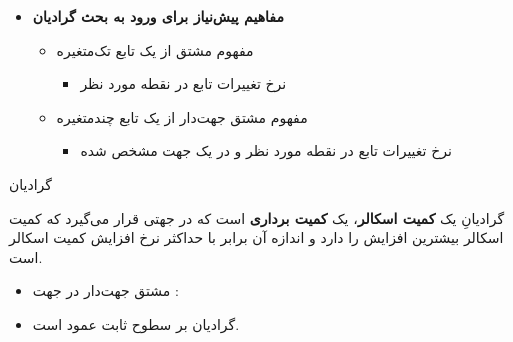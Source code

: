 \begin{ELunit}

\begin{itemize}
\tightlist
\item
  \textbf{مفاهیم پیش‌نیاز برای ورود به بحث گرادیان}

  \begin{itemize}
  \tightlist
  \item
    مفهوم مشتق از یک تابع تک‌متغیره

    \begin{itemize}
    \tightlist
    \item
      نرخ تغییرات تابع در نقطه مورد نظر
    \end{itemize}
  \item
    مفهوم مشتق جهت‌دار از یک تابع چندمتغیره

    \begin{itemize}
    \tightlist
    \item
      نرخ تغییرات تابع در نقطه مورد نظر و در یک جهت مشخص شده
    \end{itemize}
  \end{itemize}
\end{itemize}


\end{ELunit}

\begin{ELdefinition}{گرادیان}

گرادیانِ یک \textbf{کمیت اسکالر}، یک \textbf{کمیت برداری} است که در جهتی قرار می‌گیرد که کمیت اسکالر بیشترین افزایش را دارد و اندازه آن برابر با حداکثر نرخ افزایش کمیت اسکالر است.


\end{ELdefinition}

\begin{ELunit}

\begin{itemize}
\tightlist
\item
  مشتق جهت‌دار  در جهت \ELim{\dif\vect{\ell}}:
\end{itemize}


\begin{itemize}
\tightlist
\item
  گرادیان  بر سطوح  ثابت عمود است.
\end{itemize}


\end{ELunit}

